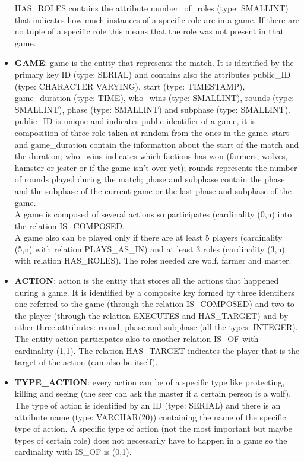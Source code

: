\begin{itemize}
    HAS\_ROLES contains the attribute number\_of\_roles (type: SMALLINT) that indicates how much instances of a specific role are in a game. If there are no tuple of a specific role this means that the role was not present in that game.
    \item \textbf{GAME}: game is the entity that represents the match. It is identified by the primary key ID (type: SERIAL) and contains also the attributes public\_ID (type: CHARACTER VARYING), start (type: TIMESTAMP), game\_duration (type: TIME), who\_wins (type: SMALLINT), rounds (type: SMALLINT), phase (type: SMALLINT) and subphase (type: SMALLINT). public\_ID is unique and indicates public identifier of a game, it is composition of three role taken at random from the ones in the game. start and game\_duration contain the information about the start of the match  and the duration; who\_wins indicates which factions has won (farmers, wolves, hamster or jester or if the game isn't over yet); rounds represents the number of rounds played during the match; phase and subphase contain the phase and the subphase of the current game or the last phase and subphase of the game. \\
    A game is composed of several actions so participates (cardinality (0,n) into the relation IS\_COMPOSED. \\
    A game also can be played only if there are at least 5 players (cardinality (5,n) with relation PLAYS\_AS\_IN) and at least 3 roles (cardinality (3,n) with relation HAS\_ROLES). The roles needed are wolf, farmer and master.
    \item \textbf{ACTION}: action is the entity that stores all the actions that happened during a game. It is identified by a composite key formed by three identifiers one referred to the game (through the relation IS\_COMPOSED) and two to the player (through the relation EXECUTES and HAS\_TARGET) and by other three attributes: round, phase and subphase (all the types: INTEGER).\\
    The entity action participates also to another relation IS\_OF with cardinality (1,1). The relation HAS\_TARGET indicates the player that is the target of the action (can also be itself).
    \item \textbf{TYPE\_ACTION}: every action can be of a specific type like protecting, killing and seeing (the seer can ask the master if a certain person is a wolf). The type of action is identified by an ID (type: SERIAL) and there is an attribute name (type: VARCHAR(20)) containing the name of the specific type of action. A specific type of action (not the most important but maybe types of certain role) does not necessarily have to happen in a game so the cardinality with IS\_OF is (0,1). 
\end{itemize}